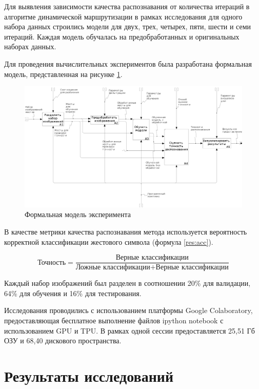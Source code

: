 Для выявления зависимости качества распознавания от количества итераций в алгоритме динамической маршрутизации в рамках исследования для одного набора данных строились модели для двух, трех, четырех, пяти, шести и семи итераций. Каждая модель обучалась на предобработанных и оригинальных наборах данных.

Для проведения вычислительных экспериментов была разработана формальная модель, представленная на рисунке \ref{res:research}.

\begin{figure}
	\centering
	\includegraphics[width=\textwidth]{inc/img/research}
	\caption{Формальная модель эксперимента}
	\label{res:research}
\end{figure}

В качестве метрики качества распознавания метода используется вероятность корректной классификации жестового символа (формула \ref{res:acc}).

\begin{equation}
\label{res:acc}
\text{Точность} = \frac{\text{Верные классификации}}{\text{Ложные классификации} + \text{Верные классификации}}
\end{equation}

Каждый набор изображений был разделен в соотношении 20\% для валидации, 64\% для обучения и 16\% для тестирования. 

Исследования проводились с использованием платформы Google Colaboratory, предоставляющая бесплатное выполнение файлов ipython notebook с использованием GPU и TPU. В рамках одной сессии предоставляется 25,51 Гб ОЗУ и 68,40 дискового пространства.

\section{Результаты исследований}


